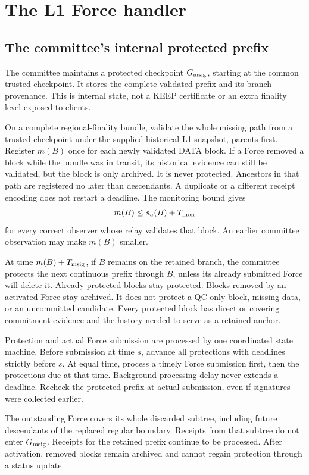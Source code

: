 \documentclass[11pt,a4paper]{article}
\begin{document}
\section{The L1 Force handler}
\label{sec:force}

\subsection{The committee's internal protected prefix}
\label{sec:protection}
The committee maintains a protected checkpoint $G_{\rm msig}$, starting
at the common trusted checkpoint. It stores the complete validated
prefix and its branch provenance. This is internal state, not a KEEP
certificate or an extra finality level exposed to clients.

On a complete regional-finality bundle, validate the whole missing path
from a trusted checkpoint under the supplied historical L1 snapshot,
parents first. Register $m(B)$ once for each newly validated DATA block.
If a Force removed a block while the bundle was in transit, its historical
evidence can still be validated, but the block is only archived. It is
never protected. Ancestors in that path are registered no
later than descendants. A duplicate or a different receipt encoding
does not restart a deadline. The monitoring bound gives
\[
 m(B)\le s_u(B)+T_{\rm mon}
\]
for every correct observer whose relay validates that block. An earlier
committee observation may make $m(B)$ smaller.

At time $m(B)+T_{\rm msig}$, if $B$ remains on the retained branch,
the committee protects the next continuous prefix through $B$, unless
its already submitted Force will delete it. Already protected blocks
stay protected. Blocks removed by an activated Force stay archived.
It does not protect a QC-only block, missing data, or an uncommitted
candidate. Every protected block has direct or covering commitment
evidence and the history needed to serve as a retained anchor.

Protection and actual Force submission are processed by one coordinated
state machine. Before submission at time $s$, advance all protections
with deadlines strictly before $s$. At equal time, process a timely
Force submission first, then the protections due at that time. Background
processing delay never extends a deadline. Recheck the protected prefix
at actual submission, even if signatures were collected earlier.

The outstanding Force covers its whole discarded subtree, including
future descendants of the replaced regular boundary. Receipts from that
subtree do not enter $G_{\rm msig}$. Receipts for the retained prefix
continue to be processed. After activation, removed blocks remain
archived and cannot regain protection through a status update.
\end{document}
